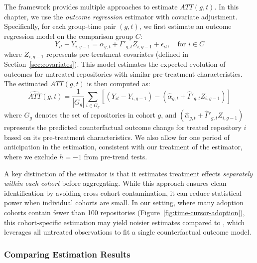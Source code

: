 The \citet{callaway2021difference} framework provides multiple approaches to estimate $ATT(g, t)$. 
In this chapter, we use the \emph{outcome regression} estimator with covariate adjustment.
Specifically, for each group-time pair $(g, t)$, we first estimate an outcome regression model on the comparison group $C$:
\begin{equation}
\label{eq:cs-outcome-reg}
Y_{it} - Y_{i,g-1} = \alpha_{g,t} + \Gamma'_{g,t} Z_{i,g-1} + \epsilon_{it}, \quad \text{for } i \in C
\end{equation}
where $Z_{i,g-1}$ represents pre-treatment covariates (defined in Section~\ref{sec:covariates}).
This model estimates the expected evolution of outcomes for untreated repositories with similar pre-treatment characteristics.
The estimated $ATT(g,t)$ is then computed as:
\begin{equation}
\label{eq:cs-att-or}
\widehat{ATT}(g, t) = \frac{1}{|G_g|}\sum_{i \in G_g} \left[ (Y_{it} - Y_{i,g-1}) - (\hat{\alpha}_{g,t} + \hat{\Gamma}'_{g,t} Z_{i,g-1}) \right]
\end{equation}
where $G_g$ denotes the set of repositories in cohort $g$, and $(\hat{\alpha}_{g,t} + \hat{\Gamma}'_{g,t} Z_{i,g-1})$ represents the predicted counterfactual outcome change for treated repository $i$ based on its pre-treatment characteristics.
We also allow for one period of anticipation in the estimation, consistent with our treatment of the \citet{borusyak2024revisiting} estimator, where we exclude $h=-1$ from pre-trend tests.

A key distinction of the \citet{callaway2021difference} estimator is that it estimates treatment effects \emph{separately within each cohort} before aggregating. 
While this approach ensures clean identification by avoiding cross-cohort contamination, it can reduce statistical power when individual cohorts are small. 
In our setting, where many adoption cohorts contain fewer than 100 repositories (Figure~\ref{fig:time-cursor-adoption}), this cohort-specific estimation may yield noisier estimates compared to \citet{borusyak2024revisiting}, which leverages all untreated observations to fit a single counterfactual outcome model.

\subsubsection{Comparing Estimation Results}
\label{sec:estimator-comp}

